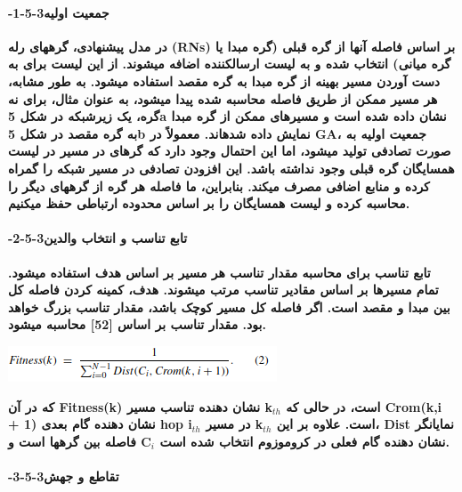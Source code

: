 \documentclass{article} %
\begin{document}
\noindent 
\paragraph{ -1-5-3جمعیت اولیه}

\noindent 
{\bf در مدل پیشنهادی، گرههای رله (RNs) بر اساس فاصله آنها از گره قبلی (گره مبدا یا گره میانی) انتخاب شده و به لیست ارسالکننده اضافه میشوند. از این لیست برای به دست آوردن مسیر بهینه از گره مبدا به گره مقصد استفاده میشود. به طور مشابه، هر مسیر ممکن از طریق فاصله محاسبه شده پیدا میشود، به عنوان مثال، برای نه گره، یک زیرشبکه در شکل 5a نشان داده شده است و مسیرهای ممکن از گره مبدا به گره مقصد در شکل 5b نمایش داده شدهاند. معمولاً در GA، جمعیت اولیه به صورت تصادفی تولید میشود، اما این احتمال وجود دارد که گرهای در مسیر در لیست همسایگان گره قبلی وجود نداشته باشد. این افزودن تصادفی در مسیر شبکه را گمراه کرده و منابع اضافی مصرف میکند. بنابراین، ما فاصله هر گره از گرههای دیگر را محاسبه کرده و لیست همسایگان را بر اساس محدوده ارتباطی حفظ میکنیم.}

\noindent 
\paragraph{ -2-5-3تابع تناسب و انتخاب والدین}

\noindent 
{\bf تابع تناسب برای محاسبه مقدار تناسب هر مسیر بر اساس هدف استفاده میشود. تمام مسیرها بر اساس مقادیر تناسب مرتب میشوند. هدف، کمینه کردن فاصله کل بین مبدا و مقصد است. اگر فاصله کل مسیر کوچک باشد، مقدار تناسب بزرگ خواهد بود. مقدار تناسب بر اساس [52] محاسبه میشود.}

\noindent 
{\bf \includegraphics*[width=3.15in, height=0.42in]{image9}}

\noindent 
{\bf که در آن Fitness(k) نشان دهنده تناسب مسیر k${}_{th}$ است، در حالی که Crom(k,i + 1) نشان دهنده گام بعدی hop i${}_{th}$ در مسیر k${}_{th}$ است. علاوه بر این، Dist نمایانگر فاصله بین گرهها است و C${}_{i}$ نشان دهنده گام فعلی در کروموزوم انتخاب شده است.}

\noindent 
\paragraph{ -3-5-3تقاطع و جهش}
\end{document}
